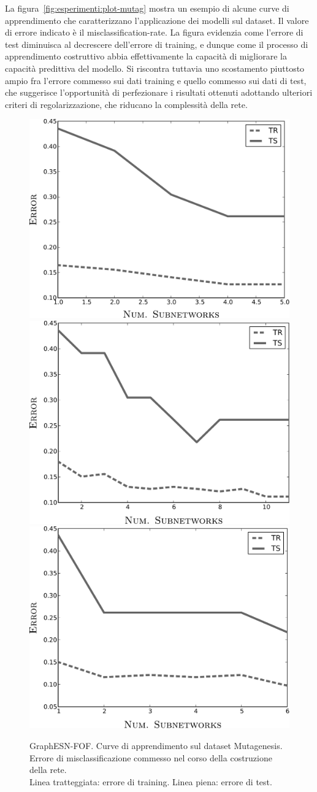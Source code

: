 La figura~\vref{fig:esperimenti:plot-mutag} mostra un esempio di alcune curve di apprendimento che caratterizzano l'applicazione dei modelli sul dataset. Il valore di errore indicato è il misclassification-rate. La figura evidenzia come l'errore di test diminuisca al decrescere dell'errore di training, e dunque come il processo di apprendimento costruttivo abbia effettivamente la capacità di migliorare la capacità predittiva del modello. Si riscontra tuttavia uno scostamento piuttosto ampio fra l'errore commesso sui dati training e quello commesso sui dati di test, che suggerisce l'opportunità di perfezionare i risultati ottenuti adottando ulteriori criteri di regolarizzazione, che riducano la complessità della rete.
\begin{figure}[p]
\centering
\includegraphics[width=0.5\columnwidth]{img/plot/mutag1}\\
\vspace*{0.8cm}
\includegraphics[width=0.5\columnwidth]{img/plot/mutag2}\\
\vspace*{0.8cm}
\includegraphics[width=0.5\columnwidth]{img/plot/mutag3}\\
\medskip
\caption[Mutag: curve di apprendimento.]{GraphESN-FOF. Curve di apprendimento sul dataset Mutagenesis. Errore di misclassificazione commesso nel corso della costruzione della rete.\\
Linea tratteggiata: errore di training. Linea piena: errore di test.}
\label{fig:esperimenti:plot-mutag}
\end{figure}


